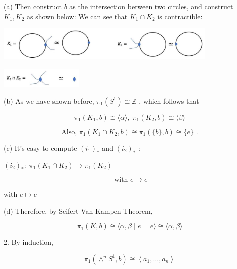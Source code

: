 (a) Then construct \(b\) as the intersection between two circles, and construct \({K}_{1},{K}_{2}\) as shown below: We can see that \({K}_{1} \cap  {K}_{2}\) is contractible:

\begin{center}
\includegraphics[max width=0.8\textwidth]{images/bo_d2bcsrref24c73avs720_149_448_1010_1043_160_0.jpg}
\end{center}
\hspace*{3em} 

\begin{center}
\includegraphics[max width=0.3\textwidth]{images/bo_d2bcsrref24c73avs720_149_780_1404_382_93_0.jpg}
\end{center}
\hspace*{3em} 

(b) As we have shown before, \({\pi }_{1}\left( {S}^{1}\right)  \cong  \mathbb{Z}\) , which follows that

\[
{\pi }_{1}\left( {{K}_{1},b}\right)  \cong  \langle \alpha \rangle ,\;{\pi }_{1}\left( {{K}_{2},b}\right)  \cong  \langle \beta \rangle
\]

\[
\text{ Also, }{\pi }_{1}\left( {{K}_{1} \cap  {K}_{2},b}\right)  \cong  {\pi }_{1}\left( {\{ b\} ,b}\right)  \cong  \{ e\} \text{ . }
\]

(c) It’s easy to compute \({\left( {i}_{1}\right) }_{ * }\) and \({\left( {i}_{2}\right) }_{ * }\) :

\({\left( {i}_{2}\right) }_{ * } : \;{\pi }_{1}\left( {{K}_{1} \cap  {K}_{2}}\right)  \rightarrow  {\pi }_{1}\left( {K}_{2}\right)\)

\[
\text{ with }e \mapsto  e
\]

with \(e \mapsto  e\)

(d) Therefore, by Seifert-Van Kampen Theorem,

\[
{\pi }_{1}\left( {K,b}\right)  \cong  \langle \alpha ,\beta  \mid  e = e\rangle  \cong  \langle \alpha ,\beta \rangle
\]

2. By induction,

\[
{\pi }_{1}\left( {{ \land  }^{n}{S}^{1},b}\right)  \cong  \left\langle  {{a}_{1},\ldots ,{a}_{n}}\right\rangle
\]

